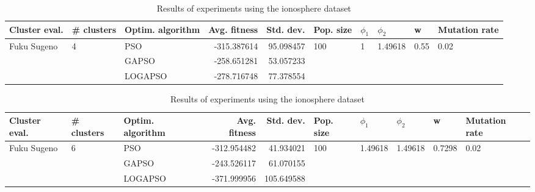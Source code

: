 \documentclass{article}
\begin{document}
\begin{table}
\centering
\caption{Results of experiments using the ionosphere dataset}
\begin{tabular}{lllrrlllll}
\toprule
               Cluster eval. &        \# clusters & Optim. algorithm &  Avg. fitness &  Std. dev. &            Pop. size &         $\phi_{1}$ &               $\phi_{2}$ &                     w &         Mutation rate \\
\midrule
\multirow{3}{*}{Fuku Sugeno} & \multirow{3}{*}{4} &              PSO &   -315.387614 &  95.098457 & \multirow{3}{*}{100} & \multirow{3}{*}{1} & \multirow{3}{*}{1.49618} & \multirow{3}{*}{0.55} & \multirow{3}{*}{0.02} \\
                             &                    &            GAPSO &   -258.651281 &  53.057233 &                      &                    &                          &                       &                       \\
                             &                    &          LOGAPSO &   -278.716748 &  77.378554 &                      &                    &                          &                       &                       \\
\bottomrule
\end{tabular}
\end{table}
\begin{table}
\centering
\caption{Results of experiments using the ionosphere dataset}
\begin{tabular}{lllrrlllll}
\toprule
               Cluster eval. &        \# clusters & Optim. algorithm &  Avg. fitness &  Std. dev. &            Pop. size &               $\phi_{1}$ &               $\phi_{2}$ &                       w &         Mutation rate \\
\midrule
\multirow{3}{*}{Fuku Sugeno} & \multirow{3}{*}{6} &              PSO &   -312.954482 &  41.934021 & \multirow{3}{*}{100} & \multirow{3}{*}{1.49618} & \multirow{3}{*}{1.49618} & \multirow{3}{*}{0.7298} & \multirow{3}{*}{0.02} \\
                             &                    &            GAPSO &   -243.526117 &  61.070155 &                      &                          &                          &                         &                       \\
                             &                    &          LOGAPSO &   -371.999956 & 105.649588 &                      &                          &                          &                         &                       \\
\bottomrule
\end{tabular}
\end{table}
\end{document}
